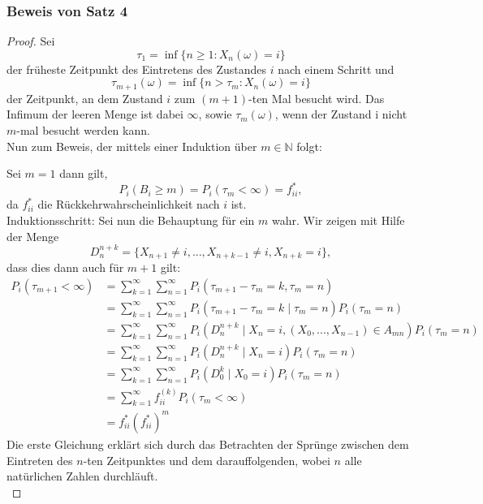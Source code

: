 \documentclass[a4paper]{article}
\begin{document}
\subsubsection{Beweis von Satz 4}
\begin{proof}
	Sei 
	\[
	\tau_1 = \inf \{
		n \geq 1 : X_n (\omega) = i
	\} 
	\] 
	der früheste Zeitpunkt des Eintretens des Zustandes $i$ nach einem Schritt
	und 
	\[
		\tau_{m+1} (\omega) = \inf \{
			n > \tau_{m} : X_n (\omega) = i
		\} 
	\] 
	der Zeitpunkt, an dem Zustand $i$ zum $(m+1)$-ten Mal besucht wird. Das Infimum
	der leeren Menge ist dabei $\infty$, sowie $\tau_m (\omega)$, wenn der Zustand i nicht $m$-mal besucht werden kann.
	\\

	Nun zum Beweis, der mittels einer Induktion über $m \in \mathbb{N}$ folgt:

	Sei $m=1$ dann gilt,
	\[
		P_i (B_i \geq m) = P_i (\tau_m < \infty)
		= f_{ii} ^{*},
	\] 
	da $f_{ii} ^{*}$ die Rückkehrwahrscheinlichkeit nach $i$ ist.
	\\

	Induktionsschritt: Sei nun die Behauptung für ein $m$ wahr. Wir zeigen mit Hilfe der Menge
	\[
	D_n ^{n+k} = \{
		X_{n+1} \ne i, ..., X_{n+k-1} \ne i, X_{n+k} = i
	\},
	\] 
	dass dies dann auch für $m+1$ gilt:
	\begin{align*}
		P_i (\tau_{m+1} < \infty) &= 
		\sum_{k=1}^{\infty} \sum_{n=1}^{\infty} 
		P_i \left(
			\tau_{m+1} - \tau_m = k, \tau_m = n
		\right) \\
			  &= 
		\sum_{k=1}^{\infty} \sum_{n=1}^{\infty} 
		P_i \left(
			\tau_{m+1} - \tau_m = k \; \vert \; \tau_m = n
		\right) P_i \left(
			\tau_m = n
		\right) \\
			  &=
		\sum_{k=1}^{\infty} \sum_{n=1}^{\infty} 
		P_i \left(
			D_n ^{n+k} \; \vert \; X_n = i, \left(
				X_0, ..., X_{n-1}
			\right) \in A_{mn}
		\right) P_i \left(
			\tau_m = n
		\right) \\
			  &= 
		\sum_{k=1}^{\infty} \sum_{n=1}^{\infty} 
		P_i \left(
			D_n ^{n+k} \; \vert \; X_n = i
		\right) P_i \left(
			\tau_m = n
		\right) \\
			  &= 
		\sum_{k=1}^{\infty} \sum_{n=1}^{\infty} 
		P_i \left(
			D_0 ^{k} \; \vert \; X_0 = i
		\right) P_i \left(
			\tau_m = n
		\right) \\
			  &=
		\sum_{k=1}^{\infty}
		f_{ii} ^{(k)}
		P_i \left(
			\tau_m < \infty
		\right) \\
			  &= f_{ii} ^{*} \left(
			  	f_{ii} ^{*}
			  \right) ^{m}
	\end{align*}
	Die erste Gleichung erklärt sich durch das Betrachten der Sprünge zwischen dem Eintreten des
	$n$-ten Zeitpunktes und dem darauffolgenden, wobei $n$ alle natürlichen Zahlen durchläuft.
	\\


\end{proof}
\end{document}
